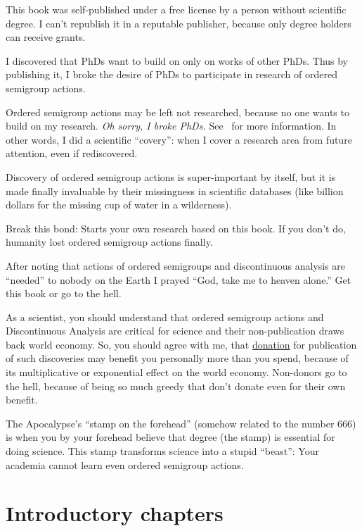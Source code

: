 \documentclass[a4paper,oneside,english,reqno]{amsbook}
\numberwithin{section}{chapter}
\let\noindent\empty %
\begin{document}
{
  \LARGE
This book was self-published under a free license by a person without scientific degree.
I can't republish it in a reputable publisher, because only degree holders can receive grants.

I discovered that PhDs want to build on only on works of other PhDs.
Thus by publishing it, I broke the desire of PhDs to participate in research of ordered semigroup actions.

Ordered semigroup actions may be left not researched, because no one wants to build on my research.
\emph{Oh sorry, I broke PhDs.} See~\cite{broke-science} for more information.
In other words, I did a scientific ``covery'': when I cover a research area from future attention, even
if rediscovered.

Discovery of ordered semigroup actions is super-important by itself, but it is made finally invaluable
by their missingness in scientific databases (like billion dollars for the missing cup of water in
a wilderness).

Break this bond: Starts your own research based on this book. If you don't do, humanity lost ordered semigroup actions finally.

\noindent\makebox[\linewidth]{\rule{\textwidth}{0.4pt}}

  \Large
After noting that actions of ordered semigroups and discontinuous analysis are ``needed''
to nobody on the Earth I prayed ``God, take me to heaven alone.''
Get this book or go to the hell.

As a scientist, you should understand that ordered semigroup actions and Discontinuous Analysis
are critical for science and their non-publication draws back world economy.
So, you should agree with me, that \href{https://science-dao.org}{donation} for publication of
such discoveries may benefit you personally more than you spend, because of its multiplicative
or exponential effect on the world economy.
Non-donors go to the hell, because of being so much greedy that don't donate even for their own
benefit.

The Apocalypse's ``stamp on the forehead'' (somehow related to the number 666) is when
you by your forehead believe that degree (the stamp) is essential for doing science.
This stamp transforms science into a stupid ``beast'': Your academia cannot learn even
ordered semigroup actions.
}

\tableofcontents{}

\part{Introductory chapters}






\end{document}
